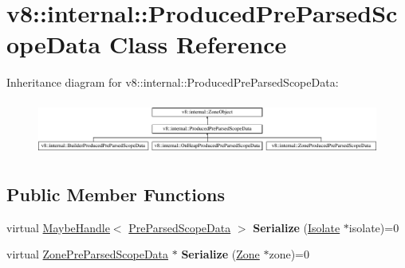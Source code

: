 \hypertarget{classv8_1_1internal_1_1ProducedPreParsedScopeData}{}\section{v8\+:\+:internal\+:\+:Produced\+Pre\+Parsed\+Scope\+Data Class Reference}
\label{classv8_1_1internal_1_1ProducedPreParsedScopeData}
Inheritance diagram for v8\+:\+:internal\+:\+:Produced\+Pre\+Parsed\+Scope\+Data\+:\begin{figure}[H]
\begin{center}
\leavevmode
\includegraphics[height=1.794872cm]{classv8_1_1internal_1_1ProducedPreParsedScopeData}
\end{center}
\end{figure}
\subsection*{Public Member Functions}
\begin{DoxyCompactItemize}
\item 
\mbox{\label{classv8_1_1internal_1_1ProducedPreParsedScopeData_a2775ea199e464ff49d4f17a47447c8aa}} 
virtual \mbox{\hyperlink{classv8_1_1internal_1_1MaybeHandle}{Maybe\+Handle}}$<$ \mbox{\hyperlink{classv8_1_1internal_1_1PreParsedScopeData}{Pre\+Parsed\+Scope\+Data}} $>$ {\bfseries Serialize} (\mbox{\hyperlink{classv8_1_1internal_1_1Isolate}{Isolate}} $\ast$isolate)=0
\item 
\mbox{\label{classv8_1_1internal_1_1ProducedPreParsedScopeData_afca4bec3cbc95ee1bee4fff286567373}} 
virtual \mbox{\hyperlink{classv8_1_1internal_1_1ZonePreParsedScopeData}{Zone\+Pre\+Parsed\+Scope\+Data}} $\ast$ {\bfseries Serialize} (\mbox{\hyperlink{classv8_1_1internal_1_1Zone}{Zone}} $\ast$zone)=0
\end{DoxyCompactItemize}
